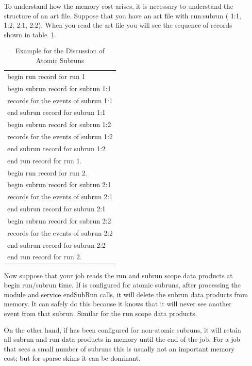 To understand how the memory cost arises,
it is necessary to understand the structure of an art file.
Suppose that you have an art file with run:subrun ( 1:1, 1:2, 2:1, 2:2).
When you read the art file you will see the sequence of records shown
in table~\ref{tab:atomicsubruns}.

\begin{table}
\begin{center}
\caption[Example For Discussion of Atomic Subruns]{Example for the Discussion of Atomic Subruns}
\label{tab:atomicsubruns}
\begin{tabular}{l}\hline
  begin run record for run 1 \\
  begin subrun record for subrun 1:1 \\
  records for the events of subrun 1:1 \\
  end subrun record for subrun 1:1 \\
   begin subrun record for subrun 1:2 \\
   records for the events of subrun 1:2 \\
   end subrun record for subrun 1:2 \\
   end run record for run 1. \\ \hline
   begin run record for run 2. \\
   begin subrun record for subrun 2:1 \\
   records for the events of subrun 2:1 \\
   end subrun record for subrun 2:1 \\
   begin subrun record for subrun 2:2 \\
   records for the events of subrun 2:2 \\
   end subrun record for subrun 2:2 \\
   end run record for run 2. \\
   \hline
  \end{tabular}
\end{center}
\end{table}

Now suppose that your job reads the run and subrun scope data products at begin run/subrun time.
If \art is configured for atomic subruns, after processing the module and service
{\code endSubRun} calls, it will delete the subrun data products from memory. It can safely do this
because it knows that it will never see another event from that subrun.
Similar for the run scope data products.

On the other hand, if \art has been configured for non-atomic subruns, it will retain all subrun
and run data products in memory until the end of the job.
For a job that sees a small number of subruns this is usually not an important memory cost; but
for sparse skims it can be dominant.



